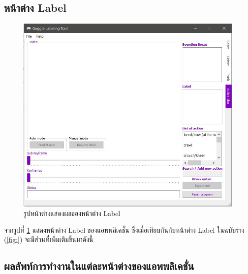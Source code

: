 \subsection*{หน้าต่าง Label}
\begin{figure}[!ht]
  \centering
    \includegraphics[scale=0.65]{chapter4/images/Final_ui/Label.jpg}
    \caption{รูปหน้าต่างแสดงผลของหน้าต่าง Label}
    \label{fig:final_label}
\end{figure}
จากรูปที่ \ref{fig:final_label} แสดงหน้าต่าง Label ของแอพพลิเคชั่น ซึ่งเมื่อเทียบกันกับหน้าต่าง Label ในฉบับร่าง (\ref{fig:}) จะมีส่วนที่เพิ่มเติมขึ้นมาดังนี้

\clearpage
\subsection{ผลลัพท์การทำงานในแต่ละหน้าต่างของแอพพลิเคชั่น}
